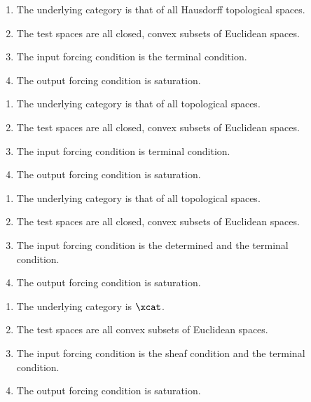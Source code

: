 \documentclass[%
12pt,%
arxiv,%
defaults
]{myclass}
\begin{document}
\begin{description}
\item[\cite{kc}]

\begin{enumerate}
\item The underlying category is that of all Hausdorff topological spaces.
\item The test spaces are all closed, convex subsets of Euclidean spaces.
\item The input forcing condition is the terminal condition.
\item The output forcing condition is saturation.
\end{enumerate}

\item[\cite{kc5}]

\begin{enumerate}
\item The underlying category is that of all topological spaces.
\item The test spaces are all closed, convex subsets of Euclidean spaces.
\item The input forcing condition is terminal condition.
\item The output forcing condition is saturation.
\end{enumerate}

\item[\cite{kc5}]

\begin{enumerate}
\item The underlying category is that of all topological spaces.
\item The test spaces are all closed, convex subsets of Euclidean spaces.
\item The input forcing condition is the determined and the terminal condition.
\item The output forcing condition is saturation.
\end{enumerate}

\item[\cite{kc3}]

\begin{enumerate}
\item The underlying category is \(\xcat\).
\item The test spaces are all convex subsets of Euclidean spaces.
\item The input forcing condition is the sheaf condition and the terminal condition.
\item The output forcing condition is saturation.
\end{enumerate}
\end{description}
\end{document}
